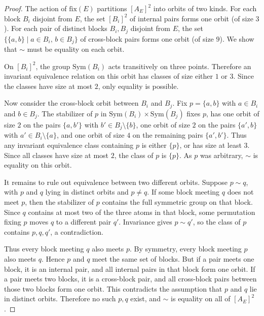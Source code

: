 \documentclass[11pt]{amsart}
\theoremstyle{definition}
\begin{document}
\begin{proof}
The action of \(\mathrm{fix}(E)\) partitions \([A_E]^2\) into orbits of two kinds.  For each block \(B_i\) disjoint from \(E\), the set \([B_i]^2\) of internal pairs forms one orbit (of size \(3\)).  For each pair of distinct blocks \(B_i,B_j\) disjoint from \(E\), the set \(\{\{a,b\}\mid a\in B_i,\, b\in B_j\}\) of cross-block pairs forms one orbit (of size \(9\)).  We show that \(\sim\) must be equality on each orbit.

On \([B_i]^2\), the group \(\mathrm{Sym}(B_i)\) acts transitively on three points.  Therefore an invariant equivalence relation on this orbit has classes of size either \(1\) or \(3\).  Since the classes have size at most \(2\), only equality is possible.

Now consider the cross-block orbit between \(B_i\) and \(B_j\).  Fix \(p=\{a,b\}\) with \(a\in B_i\) and \(b\in B_j\).  The stabilizer of \(p\) in \(\mathrm{Sym}(B_i)\times \mathrm{Sym}(B_j)\) fixes \(p\), has one orbit of size \(2\) on the pairs \(\{a,b'\}\) with \(b'\in B_j\setminus\{b\}\), one orbit of size \(2\) on the pairs \(\{a',b\}\) with \(a'\in B_i\setminus\{a\}\), and one orbit of size \(4\) on the remaining pairs \(\{a',b'\}\).  Thus any invariant equivalence class containing \(p\) is either \(\{p\}\), or has size at least \(3\).  Since all classes have size at most \(2\), the class of \(p\) is \(\{p\}\).  As \(p\) was arbitrary, \(\sim\) is equality on this orbit.

It remains to rule out equivalence between two different orbits.  Suppose \(p\sim q\), with \(p\) and \(q\) lying in distinct orbits and \(p\neq q\).  If some block meeting \(q\) does not meet \(p\), then the stabilizer of \(p\) contains the full symmetric group on that block.  Since \(q\) contains at most two of the three atoms in that block, some permutation fixing \(p\) moves \(q\) to a different pair \(q'\).  Invariance gives \(p\sim q'\), so the class of \(p\) contains \(p,q,q'\), a contradiction.

Thus every block meeting \(q\) also meets \(p\).  By symmetry, every block meeting \(p\) also meets \(q\).  Hence \(p\) and \(q\) meet the same set of blocks.  But if a pair meets one block, it is an internal pair, and all internal pairs in that block form one orbit.  If a pair meets two blocks, it is a cross-block pair, and all cross-block pairs between those two blocks form one orbit.  This contradicts the assumption that \(p\) and \(q\) lie in distinct orbits.  Therefore no such \(p,q\) exist, and \(\sim\) is equality on all of \([A_E]^2\).
\end{proof}
\end{document}
